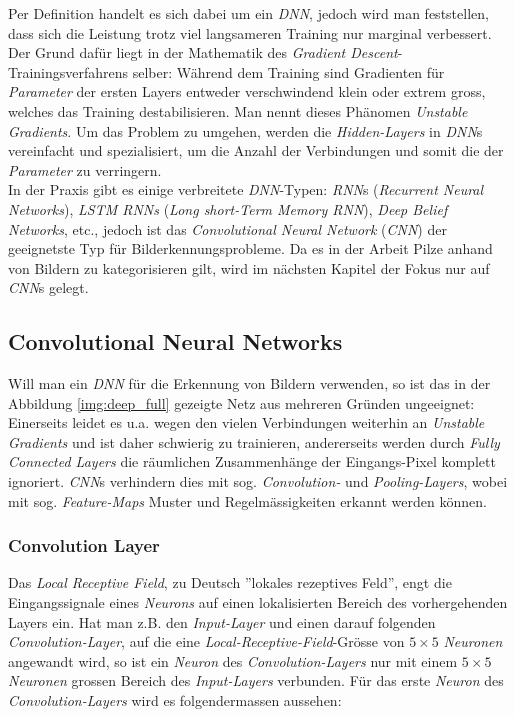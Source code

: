 Per Definition handelt es sich dabei um ein \textit{DNN}, jedoch wird man feststellen, dass sich die Leistung trotz viel langsameren Training nur marginal verbessert. Der Grund dafür liegt in der Mathematik des \textit{Gradient Descent}-Trainingsverfahrens selber: Während dem Training sind Gradienten für \textit{Parameter} der ersten Layers entweder verschwindend klein oder extrem gross, welches das Training destabilisieren. Man nennt dieses Phänomen \textit{Unstable Gradients}. Um das Problem zu umgehen, werden die \textit{Hidden-Layers} in \textit{DNN}s vereinfacht und spezialisiert, um die Anzahl der Verbindungen und somit die der \textit{Parameter} zu verringern. \\

In der Praxis gibt es einige verbreitete \textit{DNN}-Typen: \textit{RNN}s (\textit{Recurrent Neural Networks}), \textit{LSTM RNNs} (\textit{Long short-Term Memory RNN}), \textit{Deep Belief Networks}, etc., jedoch ist das \textit{Convolutional Neural Network} (\textit{CNN}) der geeignetste Typ für Bilderkennungsprobleme. Da es in der Arbeit Pilze anhand von Bildern zu kategorisieren gilt, wird im nächsten Kapitel der Fokus nur auf \textit{CNN}s gelegt.

\subsection{Convolutional Neural Networks}\label{cha:theo:cnn}
Will man ein \textit{DNN} für die Erkennung von Bildern verwenden, so ist das in der Abbildung \ref{img:deep_full} gezeigte Netz aus mehreren Gründen ungeeignet: Einerseits leidet es u.a. wegen den vielen Verbindungen weiterhin an \textit{Unstable Gradients} und ist daher schwierig zu trainieren, andererseits werden durch \textit{Fully Connected Layers} die räumlichen Zusammenhänge der Eingangs-Pixel komplett ignoriert. \textit{CNN}s verhindern dies mit sog. \textit{Convolution-} und \textit{Pooling-Layers}, wobei mit sog. \textit{Feature-Maps} Muster und Regelmässigkeiten erkannt werden können.

\subsubsection{Convolution Layer}
Das \textit{Local Receptive Field}, zu Deutsch ''lokales rezeptives Feld'', engt die Eingangssignale eines \textit{Neurons} auf einen lokalisierten Bereich des vorhergehenden Layers ein. Hat man z.B. den \textit{Input-Layer} und einen darauf folgenden \textit{Convolution-Layer}, auf die eine \textit{Local-Receptive-Field}-Grösse von $5\times 5$ \textit{Neuronen} angewandt wird, so ist ein \textit{Neuron} des \textit{Convolution-Layers} nur mit einem $5\times 5$ \textit{Neuronen} grossen Bereich des \textit{Input-Layers} verbunden. Für das erste \textit{Neuron} des \textit{Convolution-Layers} wird es folgendermassen aussehen:

